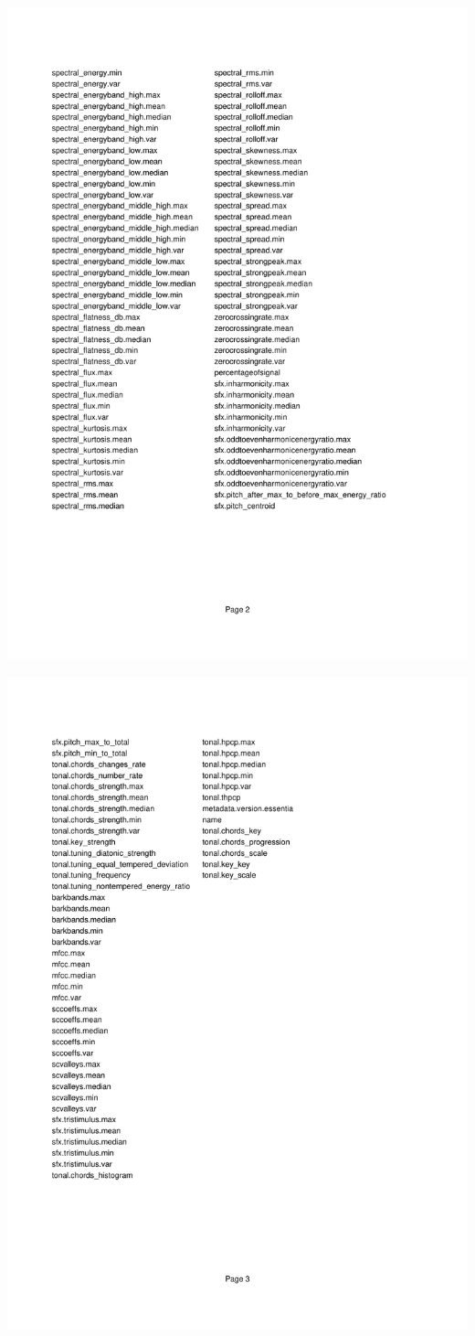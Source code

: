 \documentclass{proc}
\begin{document}
\includegraphics{img/descriptors2.pdf}

\includegraphics{img/descriptors3.pdf}
\end{document}
